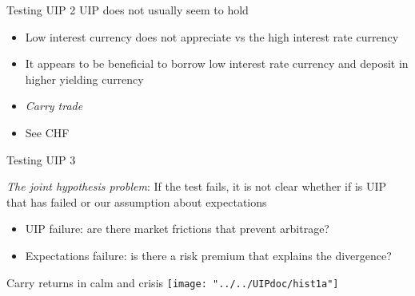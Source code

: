 \documentclass[14pt,xcolor=pdftex,dvipsnames,table]{beamer}\usepackage[]{graphicx}\usepackage[]{color}
\begin{document}
\begin{frame}{Testing UIP 2}
UIP does not usually seem to hold
\pause
\begin{itemize}[<+-| alert@+>]
\item Low interest currency does not appreciate vs the high interest rate currency
\item It appears to be beneficial to borrow low interest rate currency and deposit in higher yielding currency
\item \emph{Carry trade}
\item See CHF
\end{itemize}
\end{frame}

\begin{frame}{Testing UIP 3}
\begin{block}{}
\emph{The joint hypothesis problem}: If the test fails, it is not clear whether if is UIP that has failed or our assumption about expectations
\end{block}
\pause
\begin{itemize}[<+-| alert@+>]
\item UIP failure: are there market frictions that prevent arbitrage?   
\item Expectations failure: is there a risk premium that explains the divergence? 
\end{itemize}
\end{frame} 



\begin{frame}{Carry returns in calm and crisis}
\texttt{[image: "../../UIPdoc/hist1a"]}
\end{frame}

\end{document}
